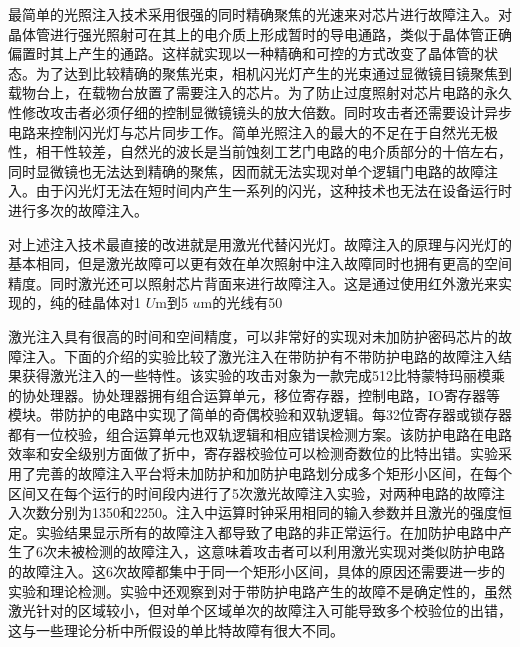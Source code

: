 \documentclass[a4paper,12pt]{article}
\begin{document}
\begin{CJK}{UTF8}{gkai}
最简单的光照注入技术采用很强的同时精确聚焦的光速来对芯片进行故障注入。对晶体管进行强光照射可在其上的电介质上形成暂时的导电通路，类似于晶体管正确偏置时其上产生的通路。这样就实现以一种精确和可控的方式改变了晶体管的状态。为了达到比较精确的聚焦光束，相机闪光灯产生的光束通过显微镜目镜聚焦到载物台上，在载物台放置了需要注入的芯片。为了防止过度照射对芯片电路的永久性修改攻击者必须仔细的控制显微镜镜头的放大倍数。同时攻击者还需要设计异步电路来控制闪光灯与芯片同步工作。简单光照注入的最大的不足在于自然光无极性，相干性较差，自然光的波长是当前蚀刻工艺门电路的电介质部分的十倍左右，同时显微镜也无法达到精确的聚焦，因而就无法实现对单个逻辑门电路的故障注入。由于闪光灯无法在短时间内产生一系列的闪光，这种技术也无法在设备运行时进行多次的故障注入。

对上述注入技术最直接的改进就是用激光代替闪光灯。故障注入的原理与闪光灯的基本相同，但是激光故障可以更有效在单次照射中注入故障同时也拥有更高的空间精度。同时激光还可以照射芯片背面来进行故障注入。这是通过使用红外激光来实现的，纯的硅晶体对1 $U$m到5 $u$m的光线有50%

激光注入具有很高的时间和空间精度，可以非常好的实现对未加防护密码芯片的故障注入。下面的介绍的实验比较了激光注入在带防护有不带防护电路的故障注入结果获得激光注入的一些特性。该实验的攻击对象为一款完成512比特蒙特玛丽模乘的协处理器。协处理器拥有组合运算单元，移位寄存器，控制电路，IO寄存器等模块。带防护的电路中实现了简单的奇偶校验和双轨逻辑。每32位寄存器或锁存器都有一位校验，组合运算单元也双轨逻辑和相应错误检测方案。该防护电路在电路效率和安全级别方面做了折中，寄存器校验位可以检测奇数位的比特出错。实验采用了完善的故障注入平台将未加防护和加防护电路划分成多个矩形小区间，在每个区间又在每个运行的时间段内进行了5次激光故障注入实验，对两种电路的故障注入次数分别为1350和2250。注入中运算时钟采用相同的输入参数并且激光的强度恒定。实验结果显示所有的故障注入都导致了电路的非正常运行。在加防护电路中产生了6次未被检测的故障注入，这意味着攻击者可以利用激光实现对类似防护电路的故障注入。这6次故障都集中于同一个矩形小区间，具体的原因还需要进一步的实验和理论检测。实验中还观察到对于带防护电路产生的故障不是确定性的，虽然激光针对的区域较小，但对单个区域单次的故障注入可能导致多个校验位的出错，这与一些理论分析中所假设的单比特故障有很大不同。


\end{CJK}
\end{document}
